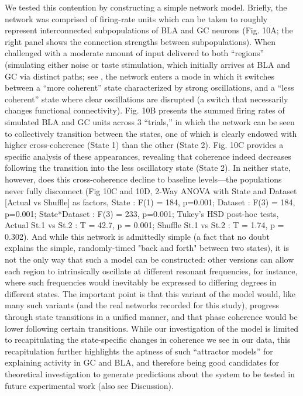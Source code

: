 \begin{refsection}
We tested this contention by constructing a simple network model. Briefly, the network was comprised of firing-rate units which can be taken to roughly represent interconnected subpopulations of BLA and GC neurons (Fig. 10A; the right panel shows the connection strengths between subpopulations). When challenged with a moderate amount of input delivered to both “regions” (simulating either noise or taste stimulation, which initially arrives at BLA and GC via distinct paths; see \cite{gal-ben-ari2012a}, the network enters a mode in which it switches between a “more coherent” state characterized by strong oscillations, and a “less coherent” state where clear oscillations are disrupted (a switch that necessarily changes functional connectivity). Fig. 10B presents the summed firing rates of simulated BLA and GC units across 3 “trials,” in which the network can be seen to collectively transition between the states, one of which is clearly endowed with higher cross-coherence (State 1) than the other (State 2).
Fig. 10C provides a specific analysis of these appearances, revealing that coherence indeed decreases following the transition into the less oscillatory state (State 2). In neither state, however, does this cross-coherence decline to baseline levels—the populations never fully disconnect (Fig 10C and 10D, 2-Way ANOVA with State and Dataset [Actual vs Shuffle] as factors, State : F(1) = 184, p=0.001; Dataset : F(3) = 184, p=0.001; State*Dataset : F(3) = 233, p=0.001; Tukey’s HSD post-hoc tests, Actual St.1 vs St.2 : T = 42.7, p = 0.001; Shuffle St.1 vs St.2 : T = 1.74, p = 0.302). And while this network is admittedly simple (a fact that no doubt explains the simple, randomly-timed "back and forth" between two states), it is not the only way that such a model can be constructed: other versions can allow each region to intrinsically oscillate at different resonant frequencies, for instance, where such frequencies would inevitably be expressed to differing degrees in different states. The important point is that this variant of the model would, like many such variants (and the real networks recorded for this study), progress through state transitions in a unified manner, and that phase coherence would be lower following certain transitions. While our investigation of the model is limited to recapitulating the state-specific changes in coherence we see in our data, this recapitulation further highlights the aptness of such “attractor models” for explaining activity in GC and BLA, and therefore being good candidates for theoretical investigation to generate predictions about the system to be tested in future experimental work (also see Discussion).


\end{refsection}
